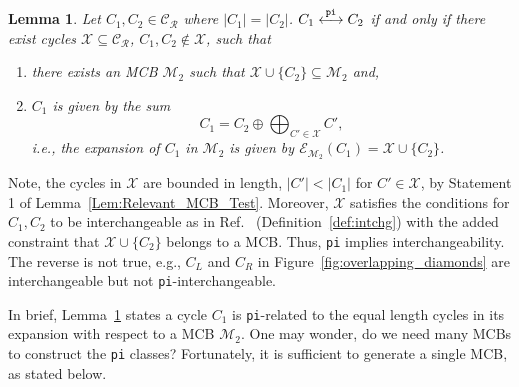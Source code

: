\documentclass[fleqn,11pt]{article}
\newtheorem{lemma}[theorem]{Lemma}
\newcommand\calM{\mathcal{M}}
\newcommand\calX{\mathcal{X}}     %
\newcommand\RelCyc{\mathcal{C_R}} %
\newcommand\expand[2]{\mathcal{E}_{#1}\left(#2\right)}   %
\newcommand\pInt{ \stackrel{\tt pi}{\longleftrightarrow} }
\begin{document}
\begin{lemma}
	Let $C_1,C_2\in\RelCyc$ where $|C_1|=|C_2|$. $C_1\pInt C_2$ %
	if and only if there exist cycles $\calX\subseteq\RelCyc$, $C_1,C_2\notin \calX$, such that
	\begin{enumerate}
		\item there exists an MCB $\calM_2$ such that $\calX\cup\{C_2\}\subseteq\calM_2$ and,
		\item $C_1$ is given by the sum
		\begin{equation}
			C_1 = C_2\oplus\bigoplus_{C'\in\calX}C',\label{eq:dir_int_C1_Ex}
		\end{equation}
		i.e., the expansion of $C_1$ in $\calM_2$ is given by $\expand{\calM_2}{C_1}=\calX\cup\{C_2\}$.
	\end{enumerate}
	\label{Lem:dir_intchg_2}
\end{lemma}
\noindent Note, the cycles in $\calX$ are bounded in length, $|C'|<|C_1|$ for $C'\in\calX$, by Statement 1 of Lemma~\ref{Lem:Relevant_MCB_Test}. Moreover, $\calX$ satisfies the conditions for $C_1,C_2$ to be interchangeable as in Ref.~\cite{gleissInterchangeability2000} (Definition~\ref{def:intchg}) with the added constraint that $\calX\cup\{C_2\}$ belongs to a MCB. 
Thus, {\tt pi} implies interchangeability. The reverse is not true, e.g., $C_L$ and $C_R$ in Figure~\ref{fig:overlapping_diamonds} are interchangeable but not {\tt pi}-interchangeable.

In brief, Lemma~\ref{Lem:dir_intchg_2} states a cycle $C_1$ is {\tt pi}-related to the equal length cycles in its expansion with respect to a MCB $\calM_2$. One may wonder, do we need many MCBs to construct the {\tt pi} classes? Fortunately, it is sufficient to generate a single MCB, as stated below.


\end{document}
